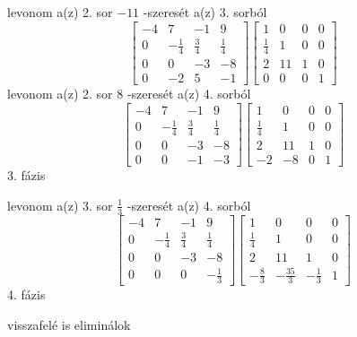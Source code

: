 \documentclass[12pt]{article}
\begin{document}
levonom a(z) 2. sor $-11$ -szeresét a(z) 3. sorból
$$\left[{\begin{array}{cccc}-4& 7& -1& 9\\ 0& -\frac{1}{4}& \frac{3}{4}& \frac{1}{4}\\ 0& 0& -3& -8\\ 0& -2& 5& -1\end{array}}\right]\left[{\begin{array}{cccc}1& 0& 0& 0\\ \frac{1}{4}& 1& 0& 0\\ 2& 11& 1& 0\\ 0& 0& 0& 1\end{array}}\right]$$
levonom a(z) 2. sor $8$ -szeresét a(z) 4. sorból
$$\left[{\begin{array}{cccc}-4& 7& -1& 9\\ 0& -\frac{1}{4}& \frac{3}{4}& \frac{1}{4}\\ 0& 0& -3& -8\\ 0& 0& -1& -3\end{array}}\right]\left[{\begin{array}{cccc}1& 0& 0& 0\\ \frac{1}{4}& 1& 0& 0\\ 2& 11& 1& 0\\ -2& -8& 0& 1\end{array}}\right]$$
3. fázis

levonom a(z) 3. sor $\frac{1}{3}$ -szeresét a(z) 4. sorból
$$\left[{\begin{array}{cccc}-4& 7& -1& 9\\ 0& -\frac{1}{4}& \frac{3}{4}& \frac{1}{4}\\ 0& 0& -3& -8\\ 0& 0& 0& -\frac{1}{3}\end{array}}\right]\left[{\begin{array}{cccc}1& 0& 0& 0\\ \frac{1}{4}& 1& 0& 0\\ 2& 11& 1& 0\\ -\frac{8}{3}& -\frac{35}{3}& -\frac{1}{3}& 1\end{array}}\right]$$
4. fázis

visszafelé is eliminálok
\end{document}
